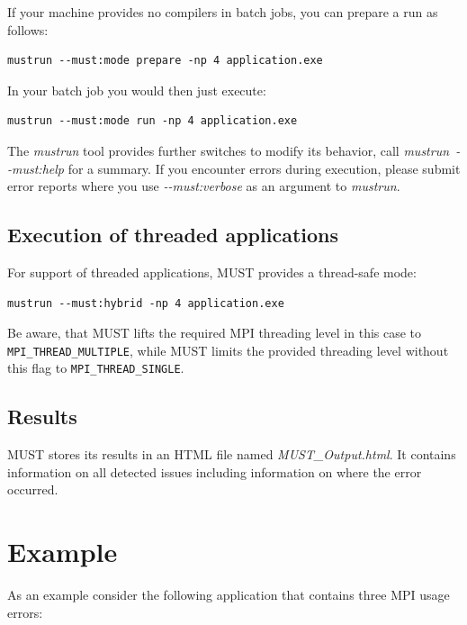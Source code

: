 \documentclass[english]{scrartcl}
\begin{document}
\noindent{}If your machine provides no compilers in batch jobs, you can prepare
a run as follows:
\begin{verbatim}
mustrun --must:mode prepare -np 4 application.exe
\end{verbatim}
In your batch job you would then just execute:
\begin{verbatim}
mustrun --must:mode run -np 4 application.exe
\end{verbatim}

\noindent{}The \emph{mustrun} tool provides further switches to modify its
behavior, call \mbox{\emph{mustrun \mbox{-{}-must:help}}} for a summary.  
If you
encounter errors during execution, please submit error reports where you use \emph{\mbox{-{}-must:verbose}} as
an argument to \emph{mustrun}.

\subsection{Execution of threaded applications}
For support of threaded applications, MUST provides a thread-safe mode:
\begin{verbatim}
mustrun --must:hybrid -np 4 application.exe
\end{verbatim}
Be aware, that MUST lifts the required MPI threading level in this case to
\texttt{MPI\_THREAD\_MULTIPLE}, while MUST limits the provided threading level without
this flag to \texttt{MPI\_THREAD\_SINGLE}.

\subsection{Results}
MUST stores its results in an HTML file named \emph{MUST\_Output.html}. It
contains information on all detected issues including information on where the
error occurred.

\section{Example}
As an example consider the following application that contains three MPI usage
errors:
\end{document}
